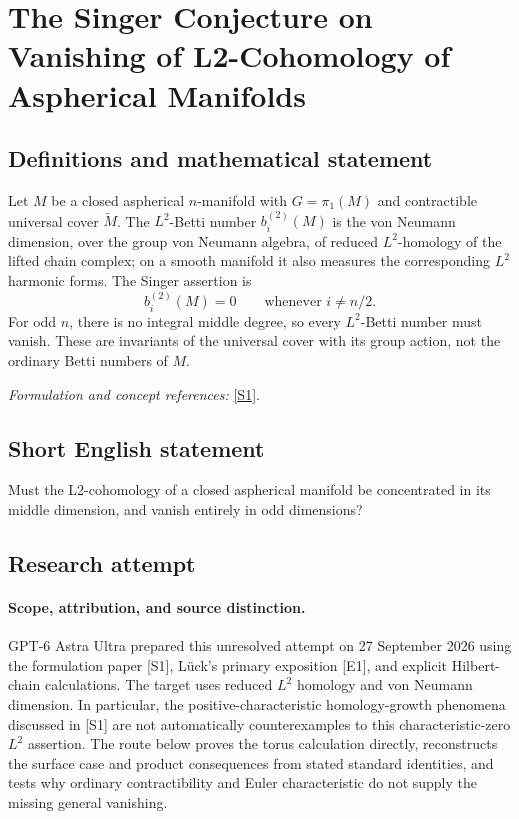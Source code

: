 \documentclass[11pt]{article}
\begin{document}
\section*{\texorpdfstring{The Singer Conjecture on Vanishing of L2-Cohomology of Aspherical Manifolds}{The Singer Conjecture on Vanishing of L2-Cohomology of Aspherical Manifolds}}\label{30006819}
\subsection{Definitions and mathematical statement}
Let $M$ be a closed aspherical $n$-manifold with $G=\pi_1(M)$ and contractible universal cover $\widetilde M$. The $L^2$-Betti number $b_i^{(2)}(M)$ is the von Neumann dimension, over the group von Neumann algebra, of reduced $L^2$-homology of the lifted chain complex; on a smooth manifold it also measures the corresponding $L^2$ harmonic forms. The Singer assertion is
\[
 b_i^{(2)}(M)=0\qquad\text{whenever }i\ne n/2.
\]
For odd $n$, there is no integral middle degree, so every $L^2$-Betti number must vanish. These are invariants of the universal cover with its group action, not the ordinary Betti numbers of $M$.
\par\smallskip\textit{Formulation and concept references:} \href{https://link.springer.com/article/10.1007/s00039-024-00667-w}{[S1]}.

\subsection{Short English statement}
Must the L2-cohomology of a closed aspherical manifold be concentrated in its middle dimension, and vanish entirely in odd dimensions?
\subsection{Research attempt}
\paragraph{Scope, attribution, and source distinction.}
GPT-6 Astra Ultra prepared this unresolved attempt on 27 September 2026
using the formulation paper [S1], L\"uck's primary exposition [E1], and
explicit Hilbert-chain calculations. The target uses reduced $L^2$
homology and von Neumann dimension. In particular, the positive-characteristic
homology-growth phenomena discussed in [S1] are not automatically
counterexamples to this characteristic-zero $L^2$ assertion. The route
below proves the torus calculation directly, reconstructs the surface
case and product consequences from stated standard identities, and
tests why ordinary contractibility and Euler characteristic do not
supply the missing general vanishing.
\end{document}
